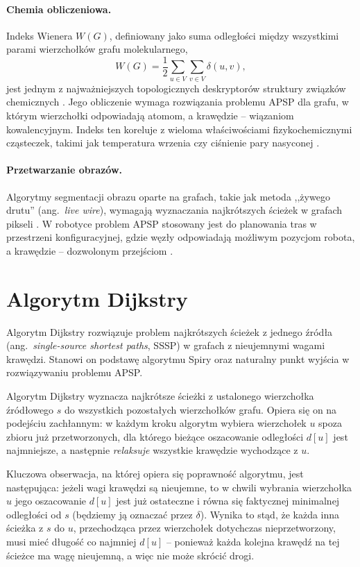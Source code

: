 \paragraph{Chemia obliczeniowa.}
Indeks Wienera $W(G)$, definiowany jako suma odległości między
wszystkimi parami wierzchołków grafu molekularnego,
\[
W(G) = \frac{1}{2}\sum_{u \in V}\sum_{v \in V} \delta(u,v),
\]
jest jednym z najważniejszych topologicznych deskryptorów
struktury związków chemicznych \cite{Reddy2016}. Jego obliczenie
wymaga rozwiązania problemu APSP dla grafu, w którym wierzchołki
odpowiadają atomom, a krawędzie -- wiązaniom kowalencyjnym.
Indeks ten koreluje z wieloma właściwościami fizykochemicznymi
cząsteczek, takimi jak temperatura wrzenia czy ciśnienie pary
nasyconej \cite{Reddy2016}.

\paragraph{Przetwarzanie obrazów.}
Algorytmy segmentacji obrazu oparte na grafach, takie jak metoda
,,żywego drutu'' (ang.\ \emph{live wire}), wymagają wyznaczania
najkrótszych ścieżek w grafach pikseli \cite{Reddy2016}.
W robotyce problem APSP stosowany jest do planowania tras
w przestrzeni konfiguracyjnej, gdzie węzły odpowiadają możliwym
pozycjom robota, a krawędzie -- dozwolonym przejściom \cite{Reddy2016}.

\section{Algorytm Dijkstry}
\label{sec:dijkstra}

Algorytm Dijkstry \cite{Dijkstra1959} rozwiązuje problem najkrótszych
ścieżek z jednego źródła (ang.\ \emph{single-source shortest paths},
SSSP) w grafach z nieujemnymi wagami krawędzi. Stanowi on podstawę
algorytmu Spiry \cite{Spira1973} oraz naturalny punkt wyjścia
w rozwiązywaniu problemu APSP.

Algorytm Dijkstry wyznacza najkrótsze ścieżki z ustalonego wierzchołka
źródłowego $s$ do wszystkich pozostałych wierzchołków grafu. Opiera się
on na podejściu zachłannym: w każdym kroku algorytm
wybiera wierzchołek $u$ spoza zbioru już przetworzonych, dla którego
bieżące oszacowanie odległości $d[u]$ jest najmniejsze, a następnie
\emph{relaksuje} wszystkie krawędzie wychodzące z $u$.

Kluczowa obserwacja, na której opiera się poprawność algorytmu, jest
następująca: jeżeli wagi krawędzi są nieujemne, to w chwili wybrania
wierzchołka $u$ jego oszacowanie $d[u]$ jest już ostateczne i równa
się faktycznej minimalnej odległości od $s$ (będziemy ją oznaczać przez $\delta$). Wynika to stąd, że każda inna ścieżka z $s$ do $u$,
przechodząca przez wierzchołek dotychczas nieprzetworzony, musi mieć
długość co najmniej $d[u]$ -- ponieważ każda kolejna krawędź na tej
ścieżce ma wagę nieujemną, a więc nie może skrócić drogi.

